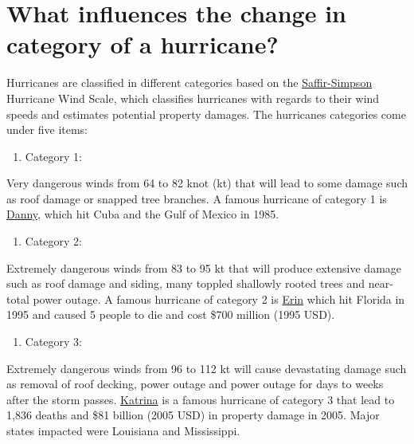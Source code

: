 \documentclass[]{book}
\providecommand{\tightlist}{%
  \setlength{\itemsep}{0pt}\setlength{\parskip}{0pt}}
\begin{document}
\hypertarget{what-influences-the-change-in-category-of-a-hurricane}{%
\section{What influences the change in category of a hurricane?}\label{what-influences-the-change-in-category-of-a-hurricane}}

Hurricanes are classified in different categories based on the \href{https://www.nhc.noaa.gov/aboutsshws.php}{Saffir-Simpson} Hurricane Wind Scale, which classifies hurricanes with regards to their wind speeds and estimates potential property damages. The hurricanes categories come under five items:

\begin{enumerate}
\def\labelenumi{(\arabic{enumi})}
\tightlist
\item
  Category 1:
\end{enumerate}

Very dangerous winds from 64 to 82 knot (kt) that will lead to some damage such as roof damage or snapped tree branches. A famous hurricane of category 1 is \href{https://en.wikipedia.org/wiki/Hurricane_Danny_(1985)}{Danny}, which hit Cuba and the Gulf of Mexico in 1985.

\begin{enumerate}
\def\labelenumi{(\arabic{enumi})}
\setcounter{enumi}{1}
\tightlist
\item
  Category 2:
\end{enumerate}

Extremely dangerous winds from 83 to 95 kt that will produce extensive damage such as roof damage and siding, many toppled shallowly rooted trees and near-total power outage. A famous hurricane of category 2 is \href{https://en.wikipedia.org/wiki/Hurricane_Erin_(1995)}{Erin} which hit Florida in 1995 and caused 5 people to die and cost \$700 million (1995 USD).

\begin{enumerate}
\def\labelenumi{(\arabic{enumi})}
\setcounter{enumi}{2}
\tightlist
\item
  Category 3:
\end{enumerate}

Extremely dangerous winds from 96 to 112 kt will cause devastating damage such as removal of roof decking, power outage and power outage for days to weeks after the storm passes. \href{https://en.wikipedia.org/wiki/Hurricane_Katrina}{Katrina} is a famous hurricane of category 3 that lead to 1,836 deaths and \$81 billion (2005 USD) in property damage in 2005. Major states impacted were Louisiana and Mississippi.
\end{document}
